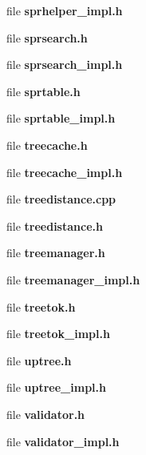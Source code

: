 \begin{CompactItemize}
file {\bf sprhelper\_\-impl.h}
\item 
file {\bf sprsearch.h}
\item 
file {\bf sprsearch\_\-impl.h}
\item 
file {\bf sprtable.h}
\item 
file {\bf sprtable\_\-impl.h}
\item 
file {\bf treecache.h}
\item 
file {\bf treecache\_\-impl.h}
\item 
file {\bf treedistance.cpp}
\item 
file {\bf treedistance.h}
\item 
file {\bf treemanager.h}
\item 
file {\bf treemanager\_\-impl.h}
\item 
file {\bf treetok.h}
\item 
file {\bf treetok\_\-impl.h}
\item 
file {\bf uptree.h}
\item 
file {\bf uptree\_\-impl.h}
\item 
file {\bf validator.h}
\item 
file {\bf validator\_\-impl.h}
\end{CompactItemize}
